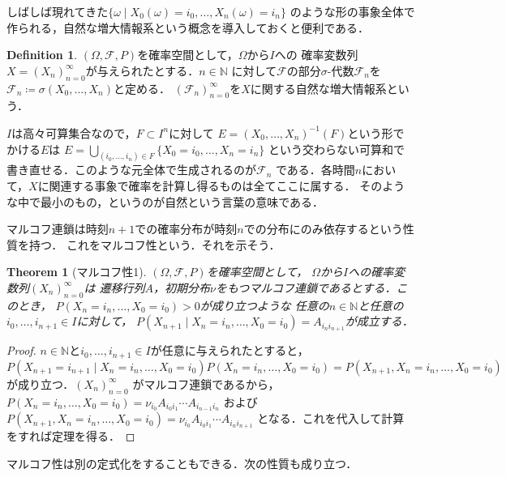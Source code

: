 \documentclass[dvipdfmx,autodetect-engine]{jsarticle}
\newtheorem{theorem}{Theorem}[section]
\theoremstyle{remark}
\theoremstyle{definition}
\newtheorem{definition}{Definition}[section]
\newcommand{\N}{\mathbb{N}}
\begin{document}
しばしば現れてきた$\{ \omega \mid X_0 (\omega)= i_0,\ldots, X_n (\omega)= i_n\}$
のような形の事象全体で作られる，自然な増大情報系という概念を導入しておくと便利である．


\begin{definition}
    $(\Omega,\mathcal{F},P)$を確率空間として，$\Omega$から$I$への
    確率変数列$X = (X_n)_{n=0}^{\infty}$が与えられたとする．$n \in \N$
    に対して$\mathcal{F}$の部分$\sigma$-代数$\mathcal{F}_n$を
    $\mathcal{F}_n \coloneqq \sigma (X_0,\ldots,X_n)$と定める．
    $(\mathcal{F}_n)_{n =0}^{\infty}$を$X$に関する自然な増大情報系という．
\end{definition}


$I$は高々可算集合なので，$F\subset I^n$に対して
$E = (X_0,\ldots,X_n)^{-1} (F)$という形でかける$E$は
$E = \bigcup_{(i_0,\ldots,i_n) \in F} \{X_0 = i_0,\ldots,X_n = i_n\}$
という交わらない可算和で書き直せる．このような元全体で生成されるのが$\mathcal{F}_n$
である．各時間$n$において，$X$に関連する事象で確率を計算し得るものは全てここに属する．
そのような中で最小のもの，というのが自然という言葉の意味である．

マルコフ連鎖は時刻$n+1$での確率分布が時刻$n$での分布にのみ依存するという性質を持つ．
これをマルコフ性という．それを示そう．


\begin{theorem}[マルコフ性1]
    $(\Omega,\mathcal{F},P)$を確率空間として，
    $\Omega$から$I$への確率変数列$(X_n)_{n=0}^{\infty}$は
    遷移行列$A$，初期分布$\nu$をもつマルコフ連鎖であるとする．このとき，
    $P(X_n = i_n,\ldots,X_0 = i_0) >0$が成り立つような
    任意の$n \in \N$と任意の$i_0,\ldots,i_{n+1} \in I$に対して，
    $P(X_{n+1} \mid X_n = i_n,\ldots,X_0 = i_0)=A_{i_n i_{n+1}}$が成立する．
\end{theorem}


\begin{proof}
    $n \in \N$と$i_0,\ldots,i_{n+1} \in I$が任意に与えられたとすると，
    $P(X_{n+1}=i_{n+1} \mid X_n = i_n,\ldots,X_0 = i_0)P(X_n = i_n,\ldots,X_0 = i_0) 
    = P(X_{n+1},X_n = i_n,\ldots,X_0 = i_0)$が成り立つ．$(X_n)_{n=0}^{\infty}$
    がマルコフ連鎖であるから，$P(X_n = i_n,\ldots,X_0 = i_0) = \nu_{i_0} A_{i_0 i_1} \cdots A_{i_{n-1} i_n}$
    および$P(X_{n+1},X_n = i_n,\ldots,X_0 = i_0) = \nu_{i_0} A_{i_0 i_1} \cdots A_{i_{n} i_{n+1}}$
    となる．これを代入して計算をすれば定理を得る．
\end{proof}


マルコフ性は別の定式化をすることもできる．次の性質も成り立つ．
\end{document}
